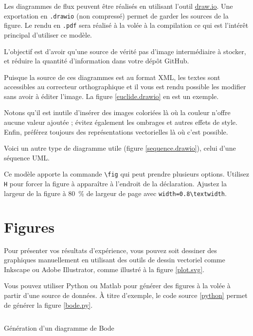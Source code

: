 Les diagrammes de flux peuvent être réalisés en utilisant l'outil \href{https://app.diagrams.net/}{draw.io}. Une exportation en \texttt{.drawio} (non compressé) permet de garder les sources de la figure. Le rendu en \texttt{.pdf} sera réalisé à la volée à la compilation ce qui est l'intérêt principal d'utiliser ce modèle.

L'objectif est d'avoir qu'une source de vérité \cad pas d'image intermédiaire à stocker, et réduire la quantité d'information dans votre dépôt GitHub.

Puisque la source de ces diagrammes est au format XML, les textes sont accessibles au correcteur orthographique et il vous est rendu possible les modifier sans avoir à éditer l'image. La figure \ref{euclide.drawio} en est un exemple.


Notons qu'il est inutile d'insérer des images coloriées là où la couleur n'offre aucune valeur ajoutée ; évitez également les ombrages et autres effets de style. Enfin, préférez toujours des représentations vectorielles là où c'est possible.

Voici un autre type de diagramme utile (figure \ref{sequence.drawio}), celui d'une séquence UML.


Ce modèle apporte la commande \verb!\fig! qui peut prendre plusieurs options. Utilisez \verb!H! pour forcer la figure à apparaître à l'endroit de la déclaration. Ajustez la largeur de la figure à \SI{80}{\percent} de largeur de page avec \verb!width=0.8\textwidth!.

\section{Figures}

Pour présenter vos résultats d'expérience, vous pouvez soit dessiner des graphiques manuellement en utilisant des outils de dessin vectoriel comme Inkscape ou Adobe Illustrator, comme illustré à la figure \ref{plot.svg}.


Vous pouvez utiliser Python ou Matlab pour générer des figures à la volée à partir d'une source de données. À titre d'exemple, le code source \ref{python} permet de générer la figure \ref{bode.py}.
\begin{listing}[ht]
    \inputminted{python}{assets/figures/bode.py}
    \caption{Génération d'un diagramme de Bode \label{python}}
\end{listing}


